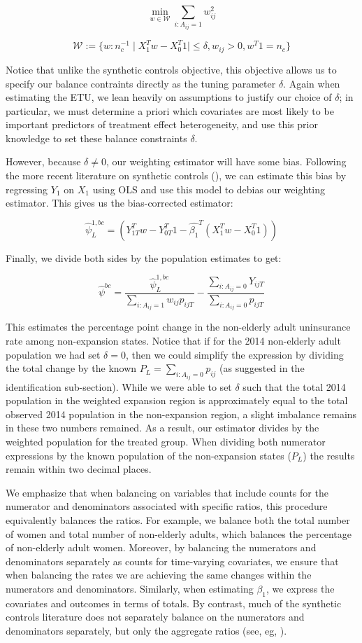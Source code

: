 \documentclass[12pt]{article}
\begin{document}
$$
\min_{w \in \mathcal{W}} \sum_{i: A_{ij} = 1} w_{ij}^2
$$

$$
\mathcal{W} := \{w: n_c^{-1} \mid X_1^Tw - X_0^T1 \mid \le \delta, w_{ij} > 0, w^T1 = n_c\}
$$

Notice that unlike the synthetic controls objective, this objective allows us to specify our balance contraints directly as the tuning parameter $\delta$. Again when estimating the ETU, we lean heavily on assumptions to justify our choice of $\delta$; in particular, we must determine a priori which covariates are most likely to be important predictors of treatment effect heterogeneity, and use this prior knowledge to set these balance constraints $\delta$. 

However, because $\delta \ne 0$, our weighting estimator will have some bias. Following the more recent literature on synthetic controls (\cite{ben2018augmented}), we can estimate this bias by regressing $Y_1$ on $X_1$ using OLS and use this model to debias our weighting estimator. This gives us the bias-corrected estimator:

$$
\hat{\psi}_L^{1, bc} = (Y_{1T}^Tw - Y_{0T}^T1 - \hat{\beta_1}^T(X_1^Tw - X_0^T1))
$$

Finally, we divide both sides by the population estimates to get:

$$
\hat{\psi}^{bc} = \frac{\hat{\psi}_L^{1, bc}}{\sum_{i: A_{ij} = 1}w_{ij}p_{ijT}} - \frac{\sum_{i: A_{ij} = 0}Y_{ijT}}{\sum_{i: A_{ij} = 0}p_{ijT}}
$$

This estimates the percentage point change in the non-elderly adult uninsurance rate among non-expansion states. Notice that if for the 2014 non-elderly adult population we had set $\delta = 0$, then we could simplify the expression by dividing the total change by the known $P_L = \sum_{i: A_{ij} = 0}p_{ij}$ (as suggested in the identification sub-section). While we were able to set $\delta$ such that the total 2014 population in the weighted expansion region is approximately equal to the total observed 2014 population in the non-expansion region, a slight imbalance remains in these two numbers remained. As a result, our estimator divides by the weighted population for the treated group. When dividing both numerator expressions by the known population of the non-expansion states ($P_L$) the results remain within two decimal places.

We emphasize that when balancing on variables that include counts for the numerator and denominators associated with specific ratios, this procedure equivalently balances the ratios. For example, we balance both the total number of women and total number of non-elderly adults, which balances the percentage of non-elderly adult women. Moreover, by balancing the numerators and denominators separately as counts for time-varying covariates, we ensure that when balancing the rates we are achieving the same changes within the numerators and denominators. Similarly, when estimating $\beta_1$, we express the covariates and outcomes in terms of totals. By contrast, much of the synthetic controls literature does not separately balance on the numerators and denominators separately, but only the aggregate ratios (see, eg, \cite{abadie2010synthetic}).
\end{document}
